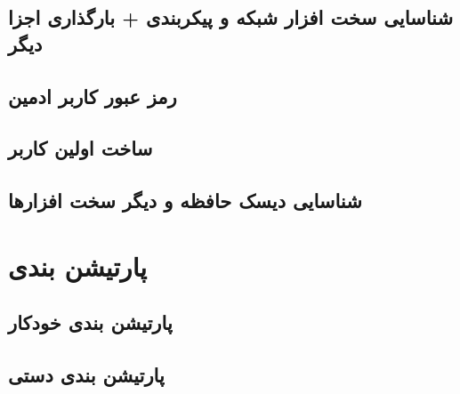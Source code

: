 \subsection{شناسایی سخت افزار شبکه و پیکربندی + بارگذاری اجزا دیگر}
\begin{frame}

\end{frame}

\subsection{رمز عبور کاربر ادمین }
\begin{frame}

\end{frame}

\subsection{ساخت اولین کاربر}
\begin{frame}

\end{frame}

\subsection{شناسایی دیسک حافظه و دیگر سخت افزارها}
\begin{frame}

\end{frame}

\section{پارتیشن بندی}
\begin{frame}

\end{frame}

\subsection{پارتیشن بندی خودکار}
\begin{frame}

\end{frame}

\subsection{پارتیشن بندی دستی}
\begin{frame}

\end{frame}

